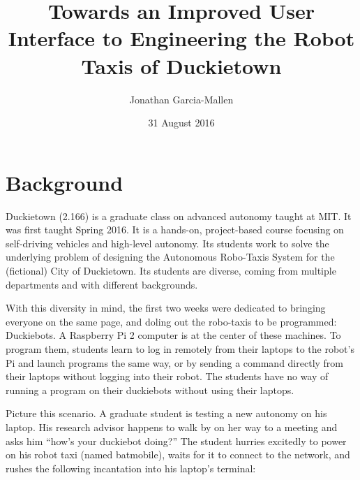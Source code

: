 \documentclass[titlepage]{article}
\title{Towards an Improved User Interface to Engineering the Robot Taxis of Duckietown}
\author{Jonathan Garcia-Mallen}
\date{31 August 2016}
\begin{document}
\lstset{language=Bash,
  numbers=left,
  stepnumber=3,    
  firstnumber=1,
  numberfirstline=true
}
\maketitle
\tableofcontents

\pagebreak

\section{Background } 
Duckietown (2.166) is a graduate class on advanced autonomy taught at MIT. It was first taught Spring 2016. It is a hands-on, project-based course focusing on self-driving vehicles and high-level autonomy. Its students work to solve the underlying problem of designing the Autonomous Robo-Taxis System for the (fictional) City of Duckietown. Its students are diverse, coming from multiple departments and with different backgrounds. 

With this diversity in mind, the first two weeks were dedicated to bringing everyone on the same page, and doling out the robo-taxis to be programmed: Duckiebots. 
A Raspberry Pi 2 computer
is at the center of these machines. To program them, students learn to log in remotely from their laptops to the robot's Pi and launch programs the same way, or by sending a command directly from their laptops without logging into their robot. The students have no way of running a program on their duckiebots without using their laptops.

Picture this scenario. A graduate student is testing a new autonomy on his laptop. His research advisor happens to walk by on her way to a meeting and asks him ``how's your duckiebot doing?'' The student hurries excitedly to power on his robot taxi (named batmobile), waits for it to connect to the network, and rushes the following incantation into his laptop's terminal:
\end{document}
